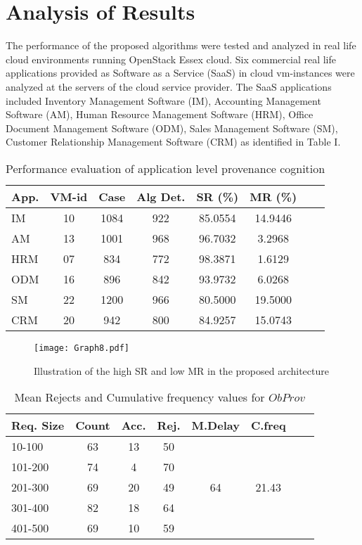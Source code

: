 \documentclass[conference]{IEEEtran}
\begin{document}
\section{Analysis of Results}

The performance of the proposed algorithms were tested and analyzed in real life cloud environments running OpenStack Essex cloud. Six commercial real life applications provided as Software as a Service (SaaS) in cloud vm-instances were analyzed at the servers of the cloud service provider. The SaaS applications included Inventory Management Software (IM), Accounting Management Software (AM), Human Resource Management Software (HRM), Office Document Management Software (ODM), Sales Management Software (SM), Customer Relationship Management Software (CRM) as identified in Table I.

\begin{table}
\caption{Performance evaluation of application level provenance cognition }
\begin{tabular}{ l||*{6}{c}r}
\hline
App. & VM-id & Case & Alg Det. & SR (\%) & MR (\%)\\
\hline
IM & 10 & 1084 & 922 & 85.0554 & 14.9446\\
AM & 13 & 1001 & 968 & 96.7032 & 3.2968\\
HRM & 07 & 834 & 772 & 98.3871  & 1.6129\\
ODM & 16 & 896 & 842 & 93.9732 & 6.0268\\
SM & 22 & 1200 & 966 & 80.5000  & 19.5000\\
CRM & 20 & 942 & 800 & 84.9257 & 15.0743\\
\hline
\end{tabular}
\end{table}



\begin{figure}[t!]
\centering
\texttt{[image: Graph8.pdf]}
\caption{Illustration of the high SR and low MR in the proposed architecture}
\label{figure11}
\end{figure}

\begin{table}
\caption{Mean Rejects and Cumulative frequency values for $ObProv$}
\begin{tabular}{ l||*{6}{c}r}
\hline
Req. Size & Count & Acc. & Rej. & M.Delay & C.freq \\
\hline
10-100 & 63 & 13 & 50 & \\
101-200 & 74 & 4 & 70 & \\
201-300 & 69 & 20 & 49 &  64 & 21.43\\
301-400 & 82 & 18 & 64 & \\
401-500 & 69 & 10 & 59 & \\
\hline
\end{tabular}
\end{table}
\end{document}
